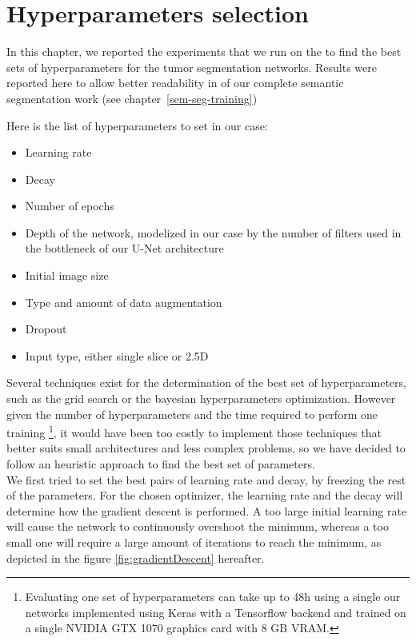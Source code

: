 \renewcommand{\arraystretch}{1}
\setlength{\tabcolsep}{7pt}

\chapter{Hyperparameters
selection}\label{appendix---hyperparameters-selection}

In this chapter, we reported the experiments that we run on the
 to find the best sets of hyperparameters for the tumor
segmentation networks. Results were reported here to allow better readability in of our complete semantic segmentation work (see chapter \ref{sem-seg-training})

Here is the list of hyperparameters to set in our case:

\begin{itemize}
\item
  Learning rate
\item
  Decay
\item
  Number of epochs
\item
  Depth of the network, modelized in our case by the number of filters
  used in the bottleneck of our U-Net architecture
\item
  Initial image size
\item
  Type and amount of data augmentation
\item
  Dropout
\item
  Input type, either single slice or 2.5D
\end{itemize}

Several techniques exist for the determination of the best set of
hyperparameters, such as the grid search or the bayesian hyperparameters
optimization. However given the number of hyperparameters and the time
required to perform one training \footnote{Evaluating one set of hyperparameters can take up to 48h using a single our networks implemented using Keras with a Tensorflow backend and trained on a single NVIDIA GTX 1070 graphics card with 8 GB VRAM.}, it would have been too costly to
implement those techniques that better suits small architectures and
less complex problems, so we have decided to follow an heuristic
approach to find the best set of parameters.\\
We first tried to set the best pairs of learning rate and decay, by
freezing the rest of the parameters. For the chosen optimizer, the
learning rate and the decay will determine how the gradient descent is
performed. A too large initial learning rate will cause the network to
continuously overshoot the minimum, whereas a too small one will require
a large amount of iterations to reach the minimum, as depicted in the figure \ref{fig:gradientDescent}
hereafter.

